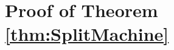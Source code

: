 \documentclass[reqno, oneside]{amsart}
\theoremstyle{definition}
\theoremstyle{plain}
\newtheorem{prop}[nul]{Proposition}
\DeclareMathOperator{\Z}{\mathbb{Z}}
\begin{document}
\section{Proof of Theorem \ref{thm:SplitMachine}}\label{app:SplittingMachine}




%







\begin{comment}

We can add this in to a second version of the paper, or perhaps write a small second paper.

\section{Snaith's Construction of Periodic Complex Bordism} \label{sec:SnaithSplitting}



\section{Miscellaneous stuff here}

It would be nice to at some point deal with showing the associated graded $E_2$ structure of BU is the thom spectrum VMU(n).  I've directly pasted in some writing from a previous argument I claimed, but it definitely uses that $\coprod BU(n)$ is an $E_2$ algebra over $\Z _{\geq 0}$ which I never got straight an actual proof of.  

\begin{prop}The associated graded of $\Sigma^{\infty}_+BU$ is $E_2$ equivalent to the Thom spectrum $\bigvee MU(n).$
\end{prop}
\begin{proof}
Let $R = BU$ with its natural filtration, and let $R^{\oplus} = \coprod BU(n)$ with its natural filtration.  Let $M$ be the ($E_\infty$) filtered spectrum which is $MU(n)$ in degree $n$, and all maps are $0$.  In other words, $\bigvee MU(n)$ with its natural filtration is $I(res(M))$.  

We begin with a filtered $E_\infty$ map $z:R^\oplus \to I(res(M))$ coming from the zero section.  Then, $R^\oplus$ comes with the structure of an $E_2$ algebra over $\Z_{\geq 0}^{fil}$.  In fact, $I(res(M))$  has a trivial structure as an $E_\infty$-algebra over $\Z_{\geq 0}^{fil}$ via the augmentation $\Z_{\geq 0}^{fil}\to S^{0,fil} \to I(res(M))$.  We may then tensor $z$ along the augmentation to get a map of $E_2$ filtered spectra $z':R \to I(res(M))$.  


\end{comment}
\end{document}
